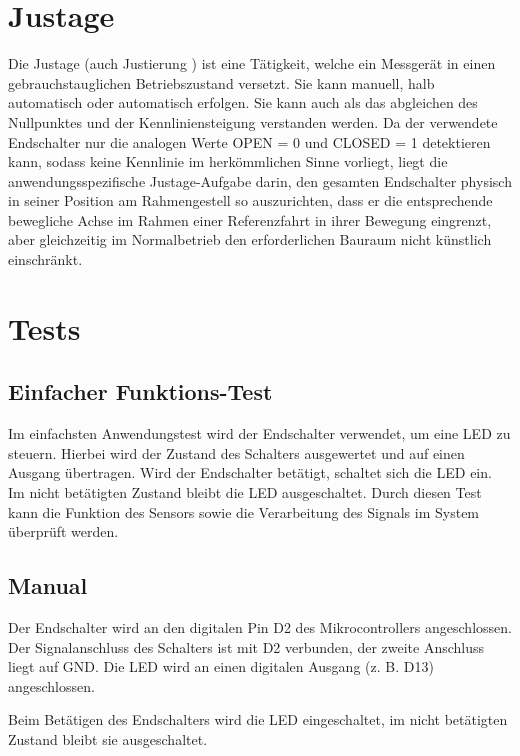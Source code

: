 \section{Justage}

Die Justage (auch \glqq Justierung\grqq{} ) ist eine \glqq Tätigkeit, welche ein Messgerät in einen gebrauchstauglichen Betriebszustand versetzt. Sie kann manuell, halb automatisch oder automatisch erfolgen.\grqq{}  \cite[17]{Helbig:2021}
	Sie kann auch als das \glqq abgleichen des Nullpunktes und der Kennliniensteigung\grqq{}  \cite[17]{Bernstein:2024} verstanden werden.
	Da der verwendete Endschalter nur die analogen Werte OPEN = 0 und CLOSED = 1 detektieren kann, sodass keine Kennlinie im herkömmlichen Sinne vorliegt, liegt die anwendungsspezifische Justage-Aufgabe darin, den gesamten Endschalter physisch in seiner Position am Rahmengestell so auszurichten, dass er die entsprechende bewegliche Achse im Rahmen einer Referenzfahrt in ihrer Bewegung eingrenzt, aber gleichzeitig im Normalbetrieb den erforderlichen Bauraum nicht künstlich einschränkt.


\section{Tests}

\subsection{Einfacher Funktions-Test}

Im einfachsten Anwendungstest wird der Endschalter verwendet, um eine LED zu steuern. 
Hierbei wird der Zustand des Schalters ausgewertet und auf einen Ausgang übertragen.
Wird der Endschalter betätigt, schaltet sich die LED ein. 
Im nicht betätigten Zustand bleibt die LED ausgeschaltet.
Durch diesen Test kann die Funktion des Sensors sowie die Verarbeitung 
des Signals im System überprüft werden.

\subsection{Manual}

Der Endschalter wird an den digitalen Pin D2 des Mikrocontrollers angeschlossen. 
Der Signalanschluss des Schalters ist mit D2 verbunden, der zweite Anschluss liegt auf GND. 
Die LED wird an einen digitalen Ausgang (z. B. D13) angeschlossen.

Beim Betätigen des Endschalters wird die LED eingeschaltet, im nicht betätigten Zustand bleibt sie ausgeschaltet.

